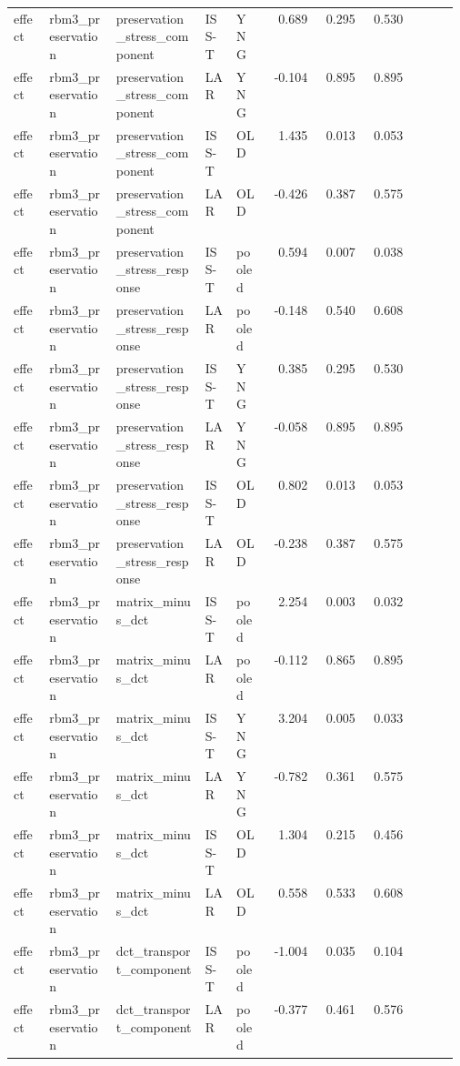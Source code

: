 \documentclass[11pt]{article}
\begin{document}
\begin{landscape}
\begin{longtable}{p{0.08\linewidth}p{0.15\linewidth}p{0.20\linewidth}p{0.07\linewidth}p{0.07\linewidth}rrrrrr}
effect & rbm3\_preservation & preservation\_stress\_component & ISS-T & YNG & 0.689 & 0.295 & 0.530 &  &  &  \\
effect & rbm3\_preservation & preservation\_stress\_component & LAR & YNG & -0.104 & 0.895 & 0.895 &  &  &  \\
effect & rbm3\_preservation & preservation\_stress\_component & ISS-T & OLD & 1.435 & 0.013 & 0.053 &  &  &  \\
effect & rbm3\_preservation & preservation\_stress\_component & LAR & OLD & -0.426 & 0.387 & 0.575 &  &  &  \\
effect & rbm3\_preservation & preservation\_stress\_response & ISS-T & pooled & 0.594 & 0.007 & 0.038 &  &  &  \\
effect & rbm3\_preservation & preservation\_stress\_response & LAR & pooled & -0.148 & 0.540 & 0.608 &  &  &  \\
effect & rbm3\_preservation & preservation\_stress\_response & ISS-T & YNG & 0.385 & 0.295 & 0.530 &  &  &  \\
effect & rbm3\_preservation & preservation\_stress\_response & LAR & YNG & -0.058 & 0.895 & 0.895 &  &  &  \\
effect & rbm3\_preservation & preservation\_stress\_response & ISS-T & OLD & 0.802 & 0.013 & 0.053 &  &  &  \\
effect & rbm3\_preservation & preservation\_stress\_response & LAR & OLD & -0.238 & 0.387 & 0.575 &  &  &  \\
effect & rbm3\_preservation & matrix\_minus\_dct & ISS-T & pooled & 2.254 & 0.003 & 0.032 &  &  &  \\
effect & rbm3\_preservation & matrix\_minus\_dct & LAR & pooled & -0.112 & 0.865 & 0.895 &  &  &  \\
effect & rbm3\_preservation & matrix\_minus\_dct & ISS-T & YNG & 3.204 & 0.005 & 0.033 &  &  &  \\
effect & rbm3\_preservation & matrix\_minus\_dct & LAR & YNG & -0.782 & 0.361 & 0.575 &  &  &  \\
effect & rbm3\_preservation & matrix\_minus\_dct & ISS-T & OLD & 1.304 & 0.215 & 0.456 &  &  &  \\
effect & rbm3\_preservation & matrix\_minus\_dct & LAR & OLD & 0.558 & 0.533 & 0.608 &  &  &  \\
effect & rbm3\_preservation & dct\_transport\_component & ISS-T & pooled & -1.004 & 0.035 & 0.104 &  &  &  \\
effect & rbm3\_preservation & dct\_transport\_component & LAR & pooled & -0.377 & 0.461 & 0.576 &  &  &  \\

\end{longtable}
\end{landscape}
\end{document}
